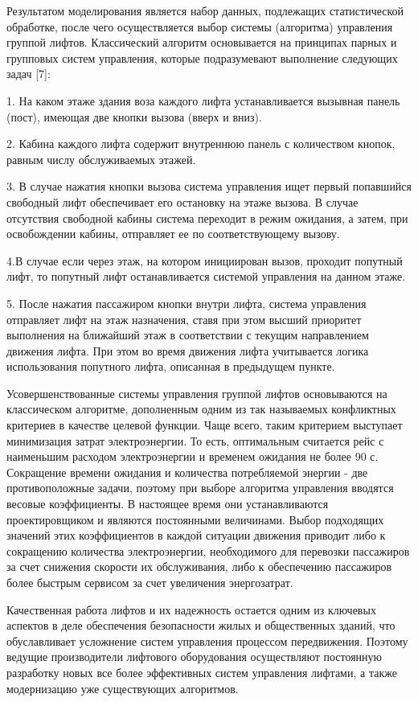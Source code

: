 	Результатом моделирования является набор данных, подлежащих статистической обработке, после чего осуществляется выбор системы (алгоритма)
		управления группой лифтов. Классический алгоритм основывается на принципах парных и групповых систем управления,
		которые подразумевают выполнение следующих задач [7]:

	1. На каком этаже здания воза каждого лифта устанавливается вызывная панель (пост), имеющая две кнопки вызова (вверх и вниз).

	2. Кабина каждого лифта содержит внутреннюю панель с количеством кнопок, равным числу обслуживаемых этажей.

	3. В случае нажатия кнопки вызова система управления ищет первый попавшийся свободный лифт обеспечивает его остановку на этаже вызова.
		В случае отсутствия свободной кабины система переходит в режим ожидания, а затем, при освобождении кабины,
		отправляет ее по соответствующему вызову.

	4.В случае если через этаж, на котором инициирован вызов, проходит попутный лифт, то попутный лифт останавливается системой управления на данном этаже.

	5. После нажатия пассажиром кнопки внутри лифта, система управления отправляет лифт на этаж назначения, ставя при этом высший приоритет
		выполнения на ближайший этаж в соответствии с текущим направлением движения лифта.
		При этом во время движения лифта учитывается логика использования попутного лифта, описанная в предыдущем пункте.

	Усовершенствованные системы управления группой лифтов основываются на классическом алгоритме, дополненным одним из так называемых конфликтных критериев
		в качестве целевой функции. Чаще всего, таким критерием выступает минимизация затрат электроэнергии. То есть, оптимальным считается рейс
		с наименьшим расходом электроэнергии и временем ожидания не более 90 с. Сокращение времени ожидания и количества потребляемой энергии -
		две противоположные задачи, поэтому при выборе алгоритма управления вводятся весовые коэффициенты.
		В настоящее время они устанавливаются проектировщиком и являются постоянными величинами. Выбор подходящих значений этих коэффициентов
		в каждой ситуации движения приводит либо к сокращению количества электроэнергии, необходимого для перевозки пассажиров за счет снижения скорости
		их обслуживания, либо к обеспечению пассажиров более быстрым сервисом за счет увеличения энергозатрат.

	Качественная работа лифтов и их надежность остается одним из ключевых аспектов в деле обеспечения безопасности жилых и общественных зданий,
		что обуславливает усложнение систем управления процессом передвижения. Поэтому ведущие производители лифтового оборудования осуществляют
		постоянную разработку новых все более эффективных систем управления лифтами, а также модернизацию уже существующих алгоритмов.


